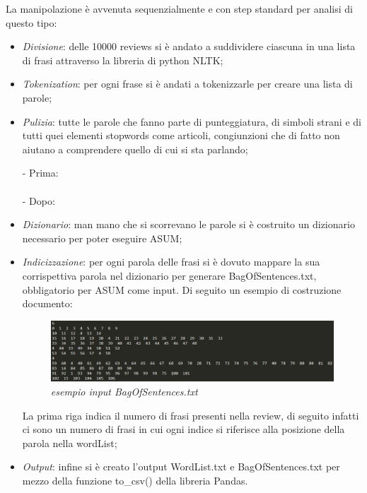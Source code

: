 \documentclass[a4paper,12pt]{article}
\begin{document}
\noindent La manipolazione è avvenuta sequenzialmente e con step standard per analisi di questo tipo:
\begin{itemize}
	\item \textit{Divisione}: delle 10000 reviews si è andato a suddividere ciascuna in una lista di frasi attraverso la libreria di python NLTK;
	\item \textit{Tokenization}: per ogni frase si è andati a tokenizzarle per creare una lista di parole;
	\item \textit{Pulizia}: tutte le parole che fanno parte di punteggiatura, di simboli strani e di tutti quei elementi stopwords come articoli, congiunzioni che di fatto non aiutano a comprendere quello di cui si sta parlando;
	
	\noindent - Prima:\\
	 \\
	
	\noindent - Dopo:\\
	
	\item \textit{Dizionario}: man mano che si scorrevano le parole si è costruito un dizionario necessario per poter eseguire ASUM;
	\item \textit{Indicizzazione}: per ogni parola delle frasi si è dovuto mappare la sua corrispettiva parola nel dizionario per generare BagOfSentences.txt, obbligatorio per ASUM come input. Di seguito un esempio di costruzione documento:
	\begin{figure}[H]
		\centering
		\includegraphics[width=0.9\linewidth]{img/inputBag.png}
		\caption{\textit{esempio input BagOfSentences.txt}}
	\end{figure}
	La prima riga indica il numero di frasi presenti nella review, di seguito infatti ci sono un numero di frasi in cui ogni indice si riferisce alla posizione della parola nella wordList;
	
	\item \textit{Output}: infine si è creato l'output WordList.txt e BagOfSentences.txt per mezzo della funzione to\_csv() della libreria Pandas.
\end{itemize}
\end{document}
